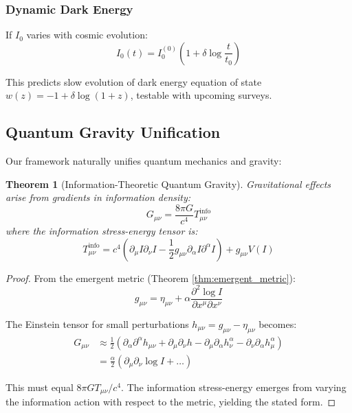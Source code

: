 \documentclass[12pt,a4paper]{article}
\newtheorem{theorem}{Theorem}[section]
\theoremstyle{remark}
\begin{document}
\subsubsection{Dynamic Dark Energy}

If $I_0$ varies with cosmic evolution:
\begin{equation}
I_0(t) = I_0^{(0)}\left(1 + \delta\log\frac{t}{t_0}\right)
\end{equation}

This predicts slow evolution of dark energy equation of state $w(z) = -1 + \delta\log(1+z)$, testable with upcoming surveys.

\subsection{Quantum Gravity Unification}
\label{sec:qg}

Our framework naturally unifies quantum mechanics and gravity:

\begin{theorem}[Information-Theoretic Quantum Gravity]
Gravitational effects arise from gradients in information density:
\begin{equation}
G_{\mu\nu} = \frac{8\pi G}{c^4} T_{\mu\nu}^{\text{info}}
\end{equation}
where the information stress-energy tensor is:
\begin{equation}
T_{\mu\nu}^{\text{info}} = c^4 \left(\partial_\mu I \partial_\nu I - \frac{1}{2}g_{\mu\nu}\partial_\alpha I \partial^\alpha I\right) + g_{\mu\nu}V(I)
\end{equation}
\end{theorem}

\begin{proof}
From the emergent metric (Theorem \ref{thm:emergent_metric}):
\begin{equation}
g_{\mu\nu} = \eta_{\mu\nu} + \alpha\frac{\partial^2\log I}{\partial x^\mu\partial x^\nu}
\end{equation}

The Einstein tensor for small perturbations $h_{\mu\nu} = g_{\mu\nu} - \eta_{\mu\nu}$ becomes:
\begin{align}
G_{\mu\nu} &\approx \frac{1}{2}(\partial_\alpha\partial^\alpha h_{\mu\nu} + \partial_\mu\partial_\nu h - \partial_\mu\partial_\alpha h^\alpha_\nu - \partial_\nu\partial_\alpha h^\alpha_\mu) \\
&= \frac{\alpha}{2}\left(\partial_\mu\partial_\nu\log I + \ldots\right)
\end{align}

This must equal $8\pi G T_{\mu\nu}/c^4$. The information stress-energy emerges from varying the information action with respect to the metric, yielding the stated form.
\end{proof}
\end{document}
